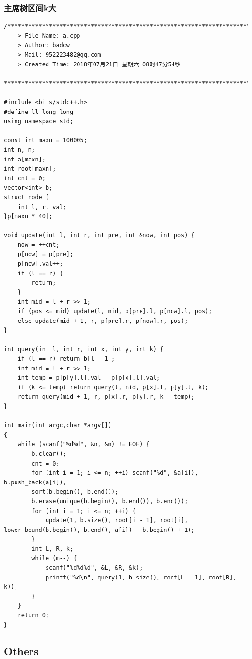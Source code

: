 \documentclass[twoside]{article}
\begin{document}
\subsubsection{主席树区间k大}
\begin{lstlisting}
/*************************************************************************
	> File Name: a.cpp
	> Author: badcw
	> Mail: 952223482@qq.com
	> Created Time: 2018年07月21日 星期六 08时47分54秒
 ************************************************************************/

#include <bits/stdc++.h>
#define ll long long
using namespace std;

const int maxn = 100005;
int n, m;
int a[maxn];
int root[maxn];
int cnt = 0;
vector<int> b;
struct node {
    int l, r, val;
}p[maxn * 40];

void update(int l, int r, int pre, int &now, int pos) {
    now = ++cnt;
    p[now] = p[pre];
    p[now].val++;
    if (l == r) {
        return;
    }
    int mid = l + r >> 1;
    if (pos <= mid) update(l, mid, p[pre].l, p[now].l, pos);
    else update(mid + 1, r, p[pre].r, p[now].r, pos);
}

int query(int l, int r, int x, int y, int k) {
    if (l == r) return b[l - 1];
    int mid = l + r >> 1;
    int temp = p[p[y].l].val - p[p[x].l].val;
    if (k <= temp) return query(l, mid, p[x].l, p[y].l, k);
    return query(mid + 1, r, p[x].r, p[y].r, k - temp);
}

int main(int argc,char *argv[])
{
    while (scanf("%d%d", &n, &m) != EOF) {
        b.clear();
        cnt = 0;
        for (int i = 1; i <= n; ++i) scanf("%d", &a[i]), b.push_back(a[i]);
        sort(b.begin(), b.end());
        b.erase(unique(b.begin(), b.end()), b.end());
        for (int i = 1; i <= n; ++i) {
            update(1, b.size(), root[i - 1], root[i], lower_bound(b.begin(), b.end(), a[i]) - b.begin() + 1);
        }
        int L, R, k;
        while (m--) {
            scanf("%d%d%d", &L, &R, &k);
            printf("%d\n", query(1, b.size(), root[L - 1], root[R], k));
        }
    }
    return 0;
}\end{lstlisting}
\subsection{Others}
\end{document}
